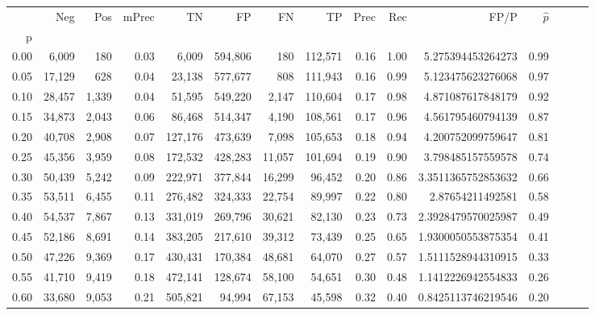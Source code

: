 \begin{tabular}{rrrrrrrrrrrrrrr}
\toprule
{} &     Neg &    Pos & mPrec &       TN &       FP &       FN &       TP &  Prec &   Rec &                 FP/P & $\hat{p}$ \\
p    &         &        &       &          &          &          &          &       &       &                      &           \\
\midrule
0.00 &   6,009 &    180 &  0.03 &    6,009 &  594,806 &      180 &  112,571 &  0.16 &  1.00 &    5.275394453264273 &      0.99 \\
0.05 &  17,129 &    628 &  0.04 &   23,138 &  577,677 &      808 &  111,943 &  0.16 &  0.99 &    5.123475623276068 &      0.97 \\
0.10 &  28,457 &  1,339 &  0.04 &   51,595 &  549,220 &    2,147 &  110,604 &  0.17 &  0.98 &    4.871087617848179 &      0.92 \\
0.15 &  34,873 &  2,043 &  0.06 &   86,468 &  514,347 &    4,190 &  108,561 &  0.17 &  0.96 &    4.561795460794139 &      0.87 \\
0.20 &  40,708 &  2,908 &  0.07 &  127,176 &  473,639 &    7,098 &  105,653 &  0.18 &  0.94 &    4.200752099759647 &      0.81 \\
0.25 &  45,356 &  3,959 &  0.08 &  172,532 &  428,283 &   11,057 &  101,694 &  0.19 &  0.90 &    3.798485157559578 &      0.74 \\
0.30 &  50,439 &  5,242 &  0.09 &  222,971 &  377,844 &   16,299 &   96,452 &  0.20 &  0.86 &   3.3511365752853632 &      0.66 \\
0.35 &  53,511 &  6,455 &  0.11 &  276,482 &  324,333 &   22,754 &   89,997 &  0.22 &  0.80 &     2.87654211492581 &      0.58 \\
0.40 &  54,537 &  7,867 &  0.13 &  331,019 &  269,796 &   30,621 &   82,130 &  0.23 &  0.73 &   2.3928479570025987 &      0.49 \\
0.45 &  52,186 &  8,691 &  0.14 &  383,205 &  217,610 &   39,312 &   73,439 &  0.25 &  0.65 &   1.9300050553875354 &      0.41 \\
0.50 &  47,226 &  9,369 &  0.17 &  430,431 &  170,384 &   48,681 &   64,070 &  0.27 &  0.57 &   1.5111528944310915 &      0.33 \\
0.55 &  41,710 &  9,419 &  0.18 &  472,141 &  128,674 &   58,100 &   54,651 &  0.30 &  0.48 &   1.1412226942554833 &      0.26 \\
0.60 &  33,680 &  9,053 &  0.21 &  505,821 &   94,994 &   67,153 &   45,598 &  0.32 &  0.40 &   0.8425113746219546 &      0.20 \\

\end{tabular}
